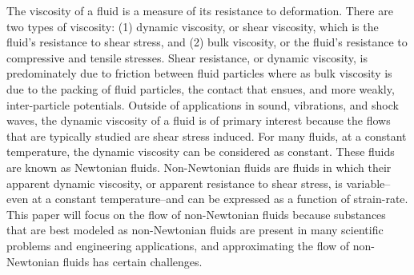 \documentclass{article}
\begin{document}
The viscosity of a fluid is a measure of its resistance to deformation.
There are two types of viscosity: (1) dynamic viscosity, or shear viscosity, which is the fluid's resistance to shear stress, and (2) bulk viscosity, or the fluid's resistance to compressive and tensile stresses.
Shear resistance, or dynamic viscosity, is predominately due to friction between fluid particles where as bulk viscosity is due to the packing of fluid particles, the contact that ensues, and more weakly, inter-particle potentials. %
Outside of applications in sound, vibrations, and shock waves, the dynamic viscosity of a fluid is of primary interest because the flows that are typically studied are shear stress induced.
For many fluids, at a constant temperature, the dynamic viscosity can be considered as constant.
These fluids are known as Newtonian fluids.
Non-Newtonian fluids are fluids in which their apparent dynamic viscosity, or apparent resistance to shear stress, is variable--even at a constant temperature--and can be expressed as a function of strain-rate.
This paper will focus on the flow of non-Newtonian fluids because substances that are best modeled as non-Newtonian fluids are present in many scientific problems and engineering applications, and approximating the flow of non-Newtonian fluids has certain challenges.
\end{document}

